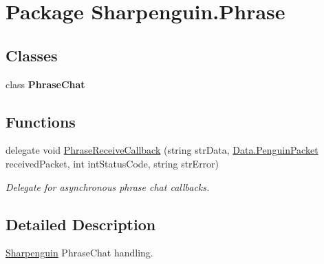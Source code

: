 \hypertarget{namespaceSharpenguin_1_1Phrase}{\section{Package Sharpenguin.\-Phrase}
\label{namespaceSharpenguin_1_1Phrase}
}
\subsection*{Classes}
\begin{DoxyCompactItemize}
\item 
class {\bfseries Phrase\-Chat}
\end{DoxyCompactItemize}
\subsection*{Functions}
\begin{DoxyCompactItemize}
\item 
\hypertarget{namespaceSharpenguin_1_1Phrase_ac3e645dd9f8881916541323963159cc2}{delegate void \hyperlink{namespaceSharpenguin_1_1Phrase_ac3e645dd9f8881916541323963159cc2}{Phrase\-Receive\-Callback} (string str\-Data, \hyperlink{classSharpenguin_1_1Data_1_1PenguinPacket}{Data.\-Penguin\-Packet} received\-Packet, int int\-Status\-Code, string str\-Error)}\label{namespaceSharpenguin_1_1Phrase_ac3e645dd9f8881916541323963159cc2}

\begin{DoxyCompactList}\small\item\em Delegate for asynchronous phrase chat callbacks. \end{DoxyCompactList}\end{DoxyCompactItemize}


\subsection{Detailed Description}
\hyperlink{namespaceSharpenguin}{Sharpenguin} Phrase\-Chat handling. 